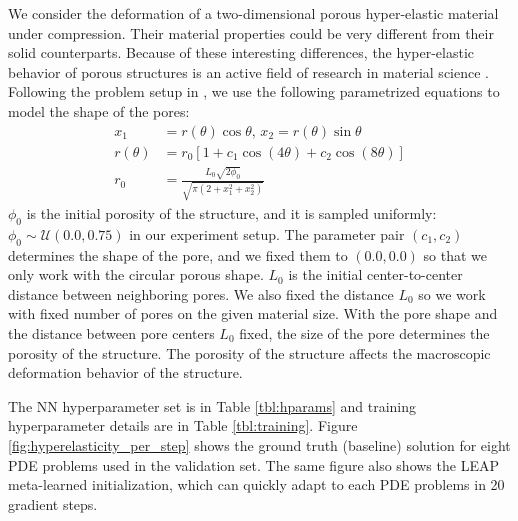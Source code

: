 We consider the deformation of a two-dimensional porous hyper-elastic material under compression. Their material properties could be very different from their solid counterparts. Because of these interesting differences, the hyper-elastic behavior of porous structures is an active field of research in material science \citep{overvelde2014relating, overvelde2012compaction}. Following the problem setup in \citep{overvelde2014relating}, we use the following parametrized equations to model the shape of the pores:
\begin{align*}
    x_1 &= r(\theta)\cos \theta, \, x_2 = r(\theta)\sin \theta \\
    r(\theta) &= r_0 \left[ 1 + c_1 \cos(4 \theta) + c_2\cos(8\theta)\right] \\
    r_0 &= \frac{L_0 \sqrt{2\phi_0}}{\sqrt{\pi \left(2 + x_1^2 + x_2^2\right)}}
\end{align*}
$\phi_0$ is the initial porosity of the structure, and it is sampled uniformly:  $\phi_0 \sim \mathcal{U}(0.0, 0.75)$ in our experiment setup. The parameter pair $(c_1, c_2)$ determines the shape of the pore, and we fixed them to $(0.0, 0.0)$ so that we only work with the circular porous shape. $L_0$ is the initial center-to-center distance between neighboring pores. We also fixed the distance $L_0$ so we work with fixed number of pores on the given material size. With the pore shape and the distance between pore centers $L_0$ fixed, the size of the pore determines the porosity of the structure. The porosity of the structure affects the macroscopic deformation behavior of the structure. 

The NN hyperparameter set is in Table \ref{tbl:hparams} and training hyperparameter details are in Table \ref{tbl:training}. Figure \ref{fig:hyperelasticity_per_step} shows the ground truth (baseline) solution for eight PDE problems used in the validation set. The same figure also shows the LEAP meta-learned initialization, which can quickly adapt to each PDE problems in 20 gradient steps. 

